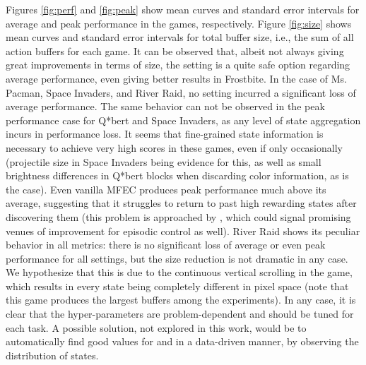 \documentclass{article}
\begin{document}
Figures \ref{fig:perf} and \ref{fig:peak} show mean curves and standard error intervals for average and peak performance in the games, respectively. Figure \ref{fig:size} shows mean curves and standard error intervals for total buffer size, i.e., the sum of all action buffers for each game. It can be observed that, albeit not always giving great improvements in terms of size, the  setting is a quite safe option regarding average performance, even giving better results in Frostbite. In the case of Ms. Pacman, Space Invaders, and River Raid, no setting incurred a significant loss of average performance. The same behavior can not be observed in the peak performance case for Q*bert and Space Invaders, as any level of state aggregation incurs in performance loss. It seems that fine-grained state information is necessary to achieve very high scores in these games, even if only occasionally (projectile size in Space Invaders being evidence for this, as well as small brightness differences in Q*bert blocks when discarding color information, as is the case). Even vanilla MFEC produces peak performance much above its average, suggesting that it struggles to return to past high rewarding states after discovering them (this problem is approached by \cite{ecoffet2020first}, which could signal promising venues of improvement for episodic control as well). River Raid shows its peculiar behavior in all metrics: there is no significant loss of average or even peak performance for all settings, but the size reduction is not dramatic in any case. We hypothesize that this is due to the continuous vertical scrolling in the game, which results in every state being completely different in pixel space (note that this game produces the largest buffers among the experiments). In any case, it is clear that the hyper-parameters are problem-dependent and should be tuned for each task. A possible solution, not explored in this work, would be to automatically find good values for  and  in a data-driven manner, by observing the distribution of states.
\end{document}
